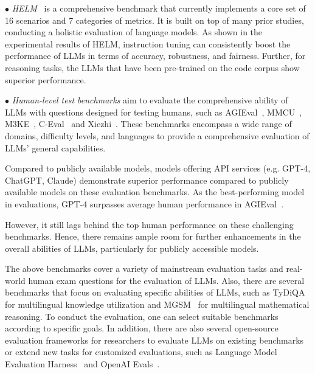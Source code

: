 {{$\bullet$ \emph{HELM}~\cite{Liang-arxiv-2022-Holistic} is a comprehensive benchmark that currently implements a core set of 16 scenarios and 7 categories of metrics. It is built on top of many prior studies, conducting a holistic evaluation of language models. As shown in the experimental results of HELM, instruction tuning can consistently boost the performance of LLMs in terms of accuracy, robustness, and fairness. Further, for reasoning tasks, the LLMs that have been pre-trained on the code corpus show superior performance.

$\bullet$ \emph{Human-level test benchmarks} aim to evaluate the comprehensive  ability of LLMs with questions designed for testing humans, such as AGIEval~\cite{Zhong-2023-arxiv-AGIEval}, MMCU~\cite{Zeng-arxiv-2023-MMCU}, M3KE~\cite{Liu-2023-arxiv-M3KE},  C-Eval~\cite{Huang-arxiv-2023-CEval} and {Xiezhi}~\cite{Gu-2023-arxiv-Xiezhi}. These benchmarks encompass a wide range of domains, difficulty levels, and languages to provide a comprehensive evaluation of LLMs' general capabilities.

Compared to publicly available models, models offering API services (e.g. GPT-4, ChatGPT, Claude) demonstrate superior performance compared to publicly available models on these evaluation benchmarks. As the best-performing model in evaluations, GPT-4 surpasses average human performance in AGIEval~\cite{Zhong-2023-arxiv-AGIEval}.

{However, it still lags behind the top human performance on these challenging benchmarks.} Hence, there remains ample room for further enhancements in the overall  abilities of LLMs, particularly for publicly accessible models. 

The above benchmarks cover a variety of mainstream evaluation tasks and real-world human exam questions for the evaluation of LLMs. Also, there are several benchmarks that focus on evaluating specific abilities of LLMs, such as TyDiQA~\cite{Clark-trans-2020-TyDi} for multilingual knowledge utilization and MGSM~\cite{Shi-arxiv-2022-Language} for multilingual mathematical reasoning. To conduct the  evaluation, one can select suitable benchmarks according to specific goals. {In addition, there are also several open-source evaluation frameworks for researchers to evaluate LLMs on existing benchmarks or extend new tasks for customized evaluations, such as Language Model Evaluation Harness~\cite{Leo-zenodo-2021-A} and OpenAI Evals~\cite{OpenAI-OpenAI-2023-GPT-4}.}

}}
